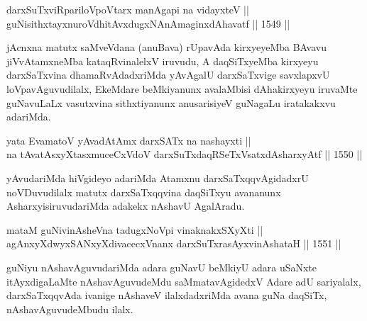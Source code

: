 \begin{shl}
darxSuTxviRpariloVpoV\s tarx manAgapi na vidayxteV || \\
\footnotemark[2]guNisithxtayxnuroVdhitAvxdugxNAnAmaginxdAhavatf \hfill || 1549 ||  
\end{shl}

\begin{artha}
jAcnxna matutx saMveVdana (anuBava) rUpavAda kirxyeyeMba BAvavu jiVvAtamxneMba kataqRvinalelxV iruvudu, A daqSiTxyeMba kirxyeyu darxSaTxvina dhamaRvAdadxriMda yAvAgalU darxSaTxvige savxlapxvU loVpavAguvudilalx, EkeMdare beMkiyanunx avalaMbisi dAhakirxyeyu iruvaMte guNavuLaLx vasutxvina sithxtiyanunx anusarisiyeV guNagaLu iratakakxvu adariMda.
\end{artha}

\begin{shl}
yata EvamatoV \footnotemark[3]yAvadAtAmx darxSATx na nashayxti || \\
na tAvatAsxyXtasxmuceCxVdoV darxSuTxdaqRSeTxVsatxdAsharxyAtf \hfill || 1550 ||  
\end{shl}

\begin{artha}
yAvudariMda hiVgideyo adariMda Atamxnu darxSaTxqqvAgidadxrU noVDuvudilalx matutx darxSaTxqqvina daqSiTxyu avananunx AsharxyisiruvudariMda adakekx nAshavU AgalAradu.
\end{artha}


\begin{shl}
mataM guNivinAsheVna tadugxNoV\s pi vinaknakxSXyXti || \\
agAnxyXdwyxSANxyXdivacecxVnanx \footnotemark[4]darxSuTxrasAyxvinAshataH \hfill || 1551 ||  
\end{shl}

\begin{artha}
guNiyu nAshavAguvudariMda adara guNavU beMkiyU adara uSaNxte itAyxdigaLaMte nAshavAguvudeMdu saMmatavAgidedxV Adare adU sariyalalx, darxSaTxqqvAda ivanige nAshaveV ilalxdadxriMda avana guNa daqSiTx, nAshavAguvudeMbudu ilalx.
\end{artha}


